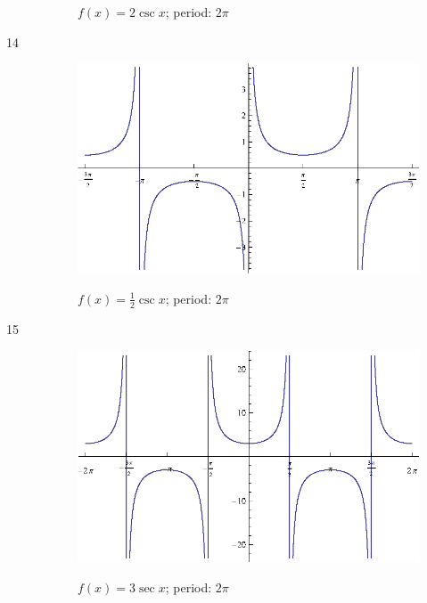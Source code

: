 \documentclass{exam}
\begin{document}
\begin{description}
\begin{figure}[H]
          $f(x) = 2 \csc x$; period: $2 \pi$
        \end{figure}

      \item[14]
        \begin{figure}[H]
          \centering
          \includegraphics[scale=0.9]{exercise14.eps}

          $f(x) = \frac{1}{2} \csc x$; period: $2 \pi$
        \end{figure}

      \item[15]
        \begin{figure}[H]
          \centering
          \includegraphics[scale=0.9]{exercise15.eps}

          $f(x) = 3 \sec x$; period: $2 \pi$
        \end{figure}


\end{description}
\end{document}
